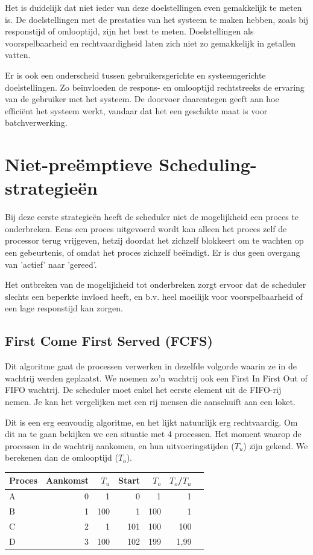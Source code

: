 Het is duidelijk dat niet ieder van deze doelstellingen even
gemakkelijk te meten is. De doelstellingen met de prestaties van het
systeem te maken hebben, zoals bij responstijd of omlooptijd, zijn het
best te meten. Doelstellingen als voorspelbaarheid en rechtvaardigheid
laten zich niet zo gemakkelijk in getallen vatten.

Er is ook een onderscheid tussen gebruikersgerichte en
systeemgerichte doelstellingen. Zo be\"invloeden de respons- en omlooptijd
rechtstreeks de ervaring van de gebruiker met het systeem. De doorvoer
daarentegen geeft aan hoe effici\"ent het systeem werkt, vandaar dat het
een geschikte maat is voor batchverwerking.

\section{Niet-pre\"emptieve Scheduling-strategie\"en}

Bij deze eerste strategie\"en heeft de scheduler niet de
mogelijkheid een proces te onderbreken. Eens een proces uitgevoerd wordt
kan alleen het proces zelf de processor terug vrijgeven, hetzij doordat
het zichzelf blokkeert om te wachten op een gebeurtenis, of omdat het
proces zichzelf be\"eindigt. Er is dus geen overgang van 'actief' naar
'gereed'.

Het ontbreken van de mogelijkheid tot onderbreken zorgt ervoor dat
de scheduler slechts een beperkte invloed heeft, en b.v. heel moeilijk
voor voorspelbaarheid of een lage responstijd kan zorgen.

\subsection{First Come First Served (FCFS)}

Dit algoritme gaat de processen verwerken in dezelfde volgorde
waarin ze in de wachtrij werden geplaatst. We noemen zo'n wachtrij ook
een First In First Out of FIFO wachtrij. De scheduler moet enkel het
eerste element uit de FIFO-rij nemen. Je kan het vergelijken met een
rij mensen die aanschuift aan een loket.

Dit is een erg eenvoudig algoritme, en het lijkt natuurlijk erg
rechtvaardig. Om dit na te gaan bekijken we een situatie met 4 processen. Het
moment waarop de processen in de wachtrij aankomen, en hun uitvoeringstijden
($T_u$) zijn gekend. We berekenen dan de omlooptijd ($T_o$).

\begin{center}
\begin{tabular}{|l|r|r|r|r|r|r|}
\hline
Proces & Aankomst & $T_u$ & Start & $T_o$ & ${T_o}$/${T_u}$ \\
\hline
A & 0 &   1 &   0 &   1 &    1 \\
B & 1 & 100 &   1 & 100 &    1 \\
C & 2 &   1 & 101 & 100 &  100 \\
D & 3 & 100 & 102 & 199 & 1,99 \\
\hline
\end{tabular}
\end{center}

